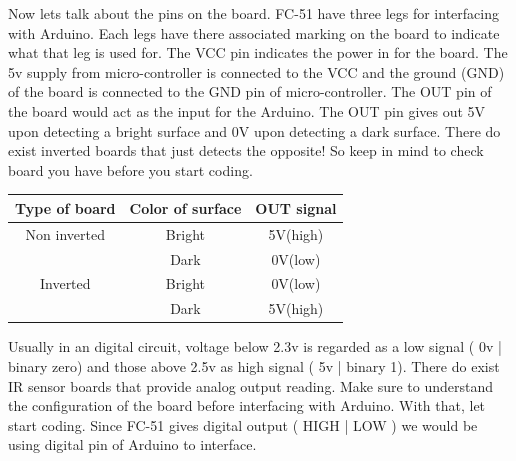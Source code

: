  Now lets talk about the pins on the board. FC-51 have three legs for interfacing with Arduino. Each legs have there associated marking on the board to indicate what that leg is used for. The VCC pin indicates the power in for the board. The 5v supply from micro-controller is connected to the VCC and the ground (GND) of the board is connected to the GND pin of micro-controller. The OUT pin of the board would act as the input for the Arduino. The OUT pin gives out 5V upon detecting a bright surface and 0V upon detecting a dark surface. There do exist inverted boards that just detects the opposite! So keep in mind to check board you have before you start coding. 

\begin{table}[h!]
    \centering
    \begin{tabular}{|c|c|c|}
    \hline
    \textbf{\hspace{0.4cm}Type of board\hspace{0.4cm}} & \textbf{\hspace{0.4cm} Color of surface\hspace{0.4cm} }& \textbf{\hspace{0.4cm}OUT signal\hspace{0.4cm}} \\
    \hline
    \centering Non inverted & Bright & 5V(high) \\ \cline{2-3} & Dark & 0V(low) \\
    \hline
    \centering Inverted & Bright & 0V(low) \\ \cline{2-3} & Dark & 5V(high) \\
    \hline
    \end{tabular}
\end{table}
\vspace{0.4cm}
\hspace{0.3cm}Usually in an digital circuit, voltage below 2.3v is regarded as a low signal ( 0v | binary zero) and those above 2.5v as high signal ( 5v | binary 1). There do exist IR sensor boards that provide analog output reading. Make sure to understand the configuration of the board before interfacing with Arduino. With that, let start coding. Since FC-51 gives digital output ( HIGH | LOW ) we would be using digital pin of Arduino to interface.

